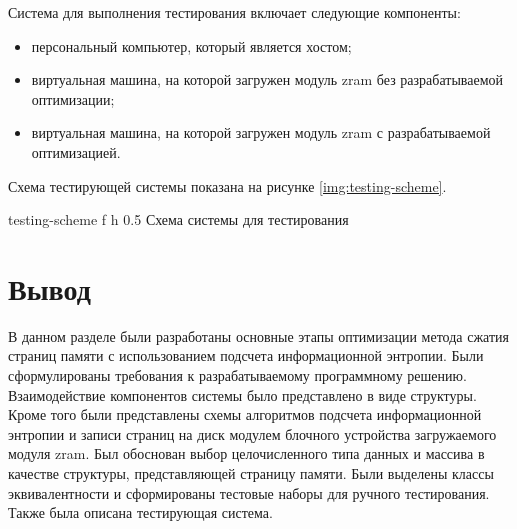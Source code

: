 Система для выполнения тестирования включает следующие компоненты:

\begin{itemize}
	\item персональный компьютер, который является хостом;
	\item виртуальная машина, на которой загружен модуль zram без разрабатываемой оптимизации;
	\item виртуальная машина, на которой загружен модуль zram с разрабатываемой оптимизацией.
\end{itemize}

Схема тестирующей системы показана на рисунке \ref{img:testing-scheme}.

    {testing-scheme}
    {f}
    {h}
    {0.5\textwidth}
    {Схема системы для тестирования}

\section*{Вывод}

В данном разделе были разработаны основные этапы оптимизации метода сжатия страниц памяти с использованием подсчета информационной энтропии. Были сформулированы требования к разрабатываемому программному решению. Взаимодействие компонентов системы было представлено в виде структуры. Кроме того были представлены схемы алгоритмов подсчета информационной энтропии и записи страниц на диск модулем блочного устройства загружаемого модуля zram. Был обоснован выбор целочисленного типа данных и массива в качестве структуры, представляющей страницу памяти. Были выделены классы эквивалентности и сформированы тестовые наборы для ручного тестирования. Также была описана тестирующая система.
